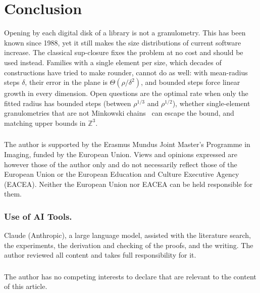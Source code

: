\documentclass[runningheads]{llncs}
\newcommand{\Z}{\mathbb{Z}}
\begin{document}
\section{Conclusion}
Opening by each digital disk of a library is not a granulometry. This has been known since 1988, yet it still makes the size distributions of current software increase. The classical sup-closure fixes the problem at no cost and should be used instead. Families with a single element per size, which decades of constructions have tried to make rounder, cannot do as well: with mean-radius steps $\delta$, their error in the plane is $\Theta(\rho/\delta^2)$, and bounded steps force linear growth in every dimension. Open questions are the optimal rate when only the fitted radius has bounded steps (between $\rho^{1/3}$ and $\rho^{1/2}$), whether single-element granulometries that are not Minkowski chains~\cite{normand2003} can escape the bound, and matching upper bounds in $\Z^3$.

\begin{credits}
\subsubsection{\ackname}
The author is supported by the Erasmus Mundus Joint Master's Programme in Imaging, funded by the European Union. Views and opinions expressed are however those of the author only and do not necessarily reflect those of the European Union or the European Education and Culture Executive Agency (EACEA). Neither the European Union nor EACEA can be held responsible for them.

\subsubsection{Use of AI Tools.}
Claude (Anthropic), a large language model, assisted with the literature search, the experiments, the derivation and checking of the proofs, and the writing. The author reviewed all content and takes full responsibility for it.

\subsubsection{\discintname}
The author has no competing interests to declare that are relevant to the content of this article.
\end{credits}



\end{document}
